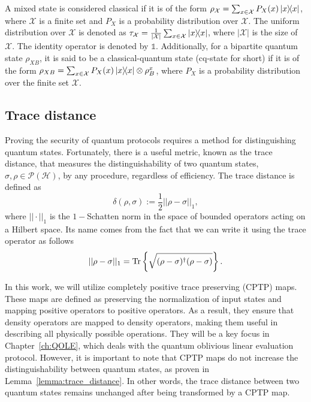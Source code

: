 A mixed state is considered classical if it is of the form $\rho_{\mathcal{X}} = \sum_{x\in\mathcal{X}} P_X(x)\ketbra{x}$, where $\mathcal{X}$ is a finite set and $P_X$ is a probability distribution over $\mathcal{X}$. The uniform distribution over $\mathcal{X}$ is denoted as $\tau_{\mathcal{X}} = \frac{1}{|\mathcal{X}|}\sum_{x\in\mathcal{X}}\ketbra{x}$, where $|\mathcal{X}|$ is the size of $\mathcal{X}$. The identity operator is denoted by $\mathds{1}$. Additionally, for a bipartite quantum state $\rho_{XB}$, it is said to be a classical-quantum state (cq-state for short) if it is of the form $\rho_{XB} = \sum_{x\in \mathcal{X}} P_X(x) \ketbra{x} \otimes \rho^x_{B}$, where $P_X$ is a probability distribution over the finite set $\mathcal{X}$.

\subsection{Trace distance}

Proving the security of quantum protocols requires a method for distinguishing quantum states. Fortunately, there is a useful metric, known as the trace distance, that measures the distinguishability of two quantum states, $\sigma, \rho \in \mathcal{P}(\mathcal{H})$, by any procedure, regardless of efficiency. The trace distance is defined as \cite{U17}
\begin{equation*}
    \delta(\rho,\sigma):=\frac{1}{2}||\rho-\sigma||_1,
\end{equation*}
where $||\cdot||_1$ is the $1-$Schatten norm in the space of bounded operators acting on a Hilbert space. Its name comes from the fact that we can write it using the trace operator as follows
\begin{equation*}
    ||\rho-\sigma||_1=\Tr\left\{\sqrt{(\rho-\sigma)^\dagger(\rho-\sigma)}\right\}.
\end{equation*}

In this work, we will utilize completely positive trace preserving (CPTP) maps. These maps are defined as preserving the normalization of input states and mapping positive operators to positive operators. As a result, they ensure that density operators are mapped to density operators, making them useful in describing all physically possible operations. They will be a key focus in Chapter~\ref{ch:QOLE}, which deals with the quantum oblivious linear evaluation protocol. However, it is important to note that CPTP maps do not increase the distinguishability between quantum states, as proven in Lemma~\ref{lemma:trace_distance}. In other words, the trace distance between two quantum states remains unchanged after being transformed by a CPTP map.

